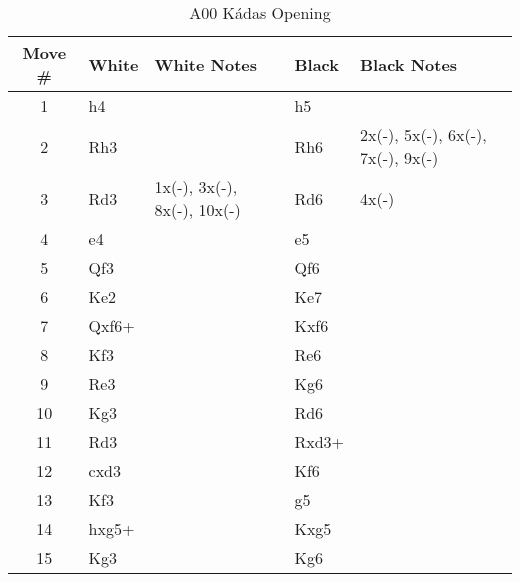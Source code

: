 \begin{table}[htbp]
\centering
\scriptsize
\caption[]{A00 Kádas Opening}
\begin{tabular}{|c|l|p{5cm}|l|p{5cm}|}
\hline
\textbf{Move \#} & \textbf{White} & \textbf{White Notes} & \textbf{Black} & \textbf{Black Notes} \\
\hline
1  & h4      &                   & h5      &                        \\
2  & Rh3     &                   & Rh6     & 2x(-), 5x(-), 6x(-), 7x(-), 9x(-) \\
3  & Rd3     & 1x(-), 3x(-), 8x(-), 10x(-) & Rd6     & 4x(-)                  \\
4  & e4      &                   & e5      &                        \\
5  & Qf3     &                   & Qf6     &                        \\
6  & Ke2     &                   & Ke7     &                        \\
7  & Qxf6+   &                   & Kxf6    &                        \\
8  & Kf3     &                   & Re6     &                        \\
9  & Re3     &                   & Kg6     &                        \\
10 & Kg3     &                   & Rd6     &                        \\
11 & Rd3     &                   & Rxd3+   &                        \\
12 & cxd3    &                   & Kf6     &                        \\
13 & Kf3     &                   & g5      &                        \\
14 & hxg5+   &                   & Kxg5    &                        \\
15 & Kg3     &                   & Kg6     &                        \\
\hline
\end{tabular}
\end{table}


